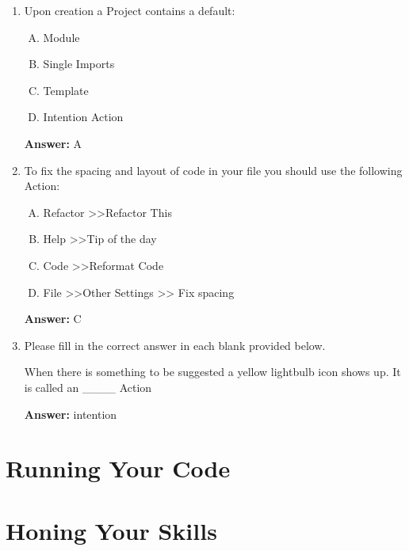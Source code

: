 \documentclass[12pt]{article}
\begin{document}
\begin{enumerate}[1.]
    \item

    Upon creation a Project contains a default:

    \bigskip

    \begin{enumerate}[A.]
        \item Module
        \item Single Imports
        \item Template
        \item Intention Action
    \end{enumerate}

    \bigskip

    \textbf{Answer:} A

    \item

    To fix the spacing and layout of code in your file you should use the
    following Action:

    \bigskip

    \begin{enumerate}[A.]
        \item Refactor \textgreater \textgreater Refactor This
        \item Help \textgreater \textgreater Tip of the day
        \item Code \textgreater \textgreater Reformat Code
        \item File \textgreater \textgreater Other Settings >> Fix spacing
    \end{enumerate}

    \bigskip

    \textbf{Answer:} C

    \item

    Please fill in the correct answer in each blank provided below.

    \bigskip

    When there is something to be suggested a yellow lightbulb icon shows up. It
    is called an \_\_\_\_  Action

    \bigskip

    \textbf{Answer:} intention

\end{enumerate}

\bigskip

\section{Running Your Code}

\bigskip

\section{Honing Your Skills}
\end{document}
